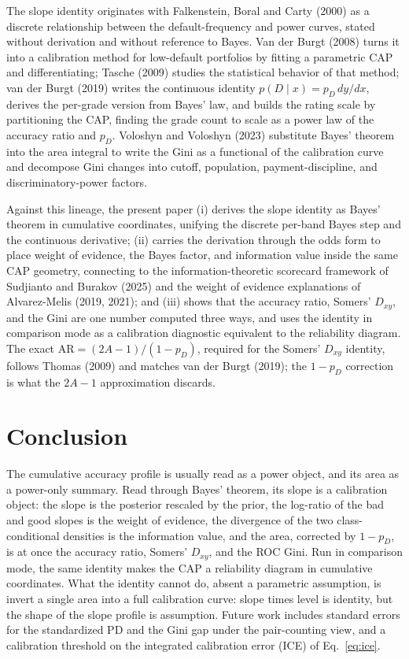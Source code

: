 \documentclass[12pt]{article}
\newcommand{\pD}{p_D}
\newcommand{\PDx}{p(D \mid x)}
\newcommand{\AR}{\mathrm{AR}}
\begin{document}
The slope identity originates with Falkenstein, Boral and Carty (2000) as a discrete
relationship between the default-frequency and power curves, stated without derivation and
without reference to Bayes. Van der Burgt (2008) turns it into a calibration method for
low-default portfolios by fitting a parametric CAP and differentiating; Tasche (2009) studies
the statistical behavior of that method; van der Burgt (2019) writes the continuous identity
$\PDx=\pD\,dy/dx$, derives the per-grade version from Bayes' law, and builds the rating scale
by partitioning the CAP, finding the grade count to scale as a power law of the accuracy ratio
and $\pD$. Voloshyn and Voloshyn (2023) substitute Bayes' theorem into the area integral to
write the Gini as a functional of the calibration curve and decompose Gini changes into cutoff,
population, payment-discipline, and discriminatory-power factors.

Against this lineage, the present paper (i) derives the slope identity as Bayes' theorem in
cumulative coordinates, unifying the discrete per-band Bayes step and the continuous
derivative; (ii) carries the derivation through the odds form to place weight of evidence, the
Bayes factor, and information value inside the same CAP geometry, connecting to the
information-theoretic scorecard framework of Sudjianto and Burakov (2025) and the
weight of evidence explanations of Alvarez-Melis (2019, 2021); and (iii) shows that the
accuracy ratio, Somers' $D_{xy}$, and the Gini are one number computed three ways, and
uses the identity in comparison mode as a calibration diagnostic equivalent to the reliability
diagram. The exact $\AR=(2A-1)/(1-\pD)$, required for the Somers' $D_{xy}$ identity, follows
Thomas (2009) and matches van der Burgt (2019); the $1-\pD$ correction is what the
$2A-1$ approximation discards.

\section{Conclusion}

The cumulative accuracy profile is usually read as a power object, and its area as a
power-only summary. Read through Bayes' theorem, its slope is a calibration object: the slope
is the posterior rescaled by the prior, the log-ratio of the bad and good slopes is the weight
of evidence, the divergence of the two class-conditional densities is the information value, and the area,
corrected by $1-\pD$, is at once the accuracy ratio, Somers' $D_{xy}$, and the ROC Gini. Run
in comparison mode, the same identity makes the CAP a reliability diagram in cumulative
coordinates. What the identity cannot do, absent a parametric assumption, is invert a single
area into a full calibration curve: slope times level is identity, but the shape of the
slope profile is assumption. Future work includes standard errors for the standardized PD and the Gini gap under the
pair-counting view, and a calibration threshold on the integrated calibration error (ICE) of
Eq.~\eqref{eq:ice}.
\end{document}
